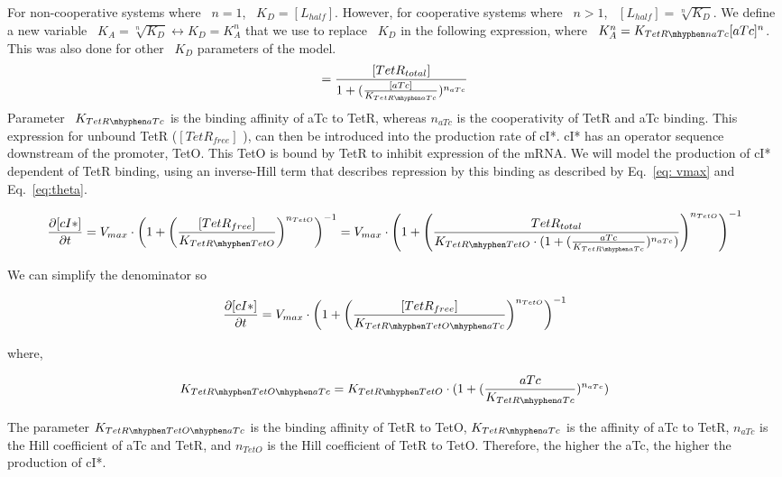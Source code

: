 For non-cooperative systems where ~$n=1$, ~$K_{D}=[L_{half}]$.
However, for cooperative systems where ~$n>1$, ~$[L_{half}] = \sqrt[n]{K_{D}}$.
We define a new variable ~$K_{A} = \sqrt[n]{K_{D}} \leftrightarrow K_{D} = K^n_{A}$ that we use to replace ~$K_{D}$ in the following expression, where ~$K^n_{A} = K_{TetR \mhyphen naTc}{[aTc]^n}$.
This was also done for other ~$K_{D}$ parameters of the model.
\begin{equation}
[TetR_{free}] =  \frac{[TetR_{total}]}{1+(\frac{[aTc]}{K_{TetR \mhyphen aTc}})^{n_{aTc}}}
\end{equation}
Parameter ~$K_{TetR \mhyphen aTc}$ is the binding affinity of aTc to TetR, whereas $n_{aTc}$ is the cooperativity of TetR and aTc binding.
This expression for unbound TetR ($[TetR_{free}]$ ), can then be introduced into the production rate of cI*.
cI* has an operator sequence downstream of the promoter, TetO.
This TetO is bound by TetR to inhibit expression of the mRNA. We will model the production of cI* dependent of TetR binding, using an inverse-Hill term that describes repression by this binding as described by Eq.~\ref{eq: vmax} and Eq.~\ref{eq:theta}.

\begin{equation}
    \pdv{[cI*]}{t} = V_{max}\cdot \left(1+\left(\frac{[TetR_{free}]}{K_{TetR \mhyphen TetO}}\right)^{n_{TetO}}\right)^{-1} = V_{max} \cdot \left(1+\left(\frac{TetR_{total}}{K_{TetR \mhyphen TetO}\cdot(1+(\frac{aTc}{K_{TetR \mhyphen aTc}})^{n_{aTc}})}\right)^{n_{TetO}}\right)^{-1}
\end{equation}

We can simplify the denominator so

\begin{equation}
    \pdv{[cI*]}{t} = V_{max}\cdot \left(1+\left(\frac{[TetR_{free}]}{K_{TetR \mhyphen TetO \mhyphen aTc }}\right)^{n_{TetO}}\right)^{-1}
\end{equation}

where,

\begin{equation}
    K_{TetR \mhyphen TetO \mhyphen aTc }=K_{TetR \mhyphen TetO}\cdot(1+(\frac{aTc}{K_{TetR \mhyphen aTc}})^{n_{aTc}})
\end{equation}

The parameter $K_{TetR \mhyphen TetO \mhyphen aTc }$ is the binding affinity of TetR to TetO, $K_{TetR \mhyphen aTc}$ is the affinity of aTc to TetR, $n_{aTc}$ is the Hill coefficient of aTc and TetR, and $n_{TetO}$ is the Hill coefficient of TetR to TetO.
Therefore, the higher the aTc, the higher the production of cI*.

